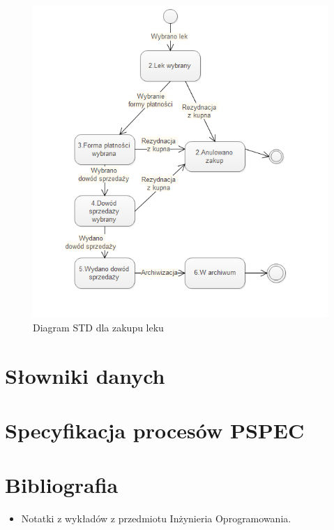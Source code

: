 \documentclass[a4paper, 11pt]{article}
\begin{document}
	\begin{figure}[H]
\centerline{\includegraphics[scale=1]{STDzakup.png}}
\caption{Diagram STD dla zakupu leku}
\end{figure}
	\section{Słowniki danych}
	
	\section{Specyfikacja procesów PSPEC}
	
	
	\section{Bibliografia}
	\begin{itemize}
	\item Notatki z wykładów z przedmiotu Inżynieria Oprogramowania.
	\end{itemize}
	
\end{document}

